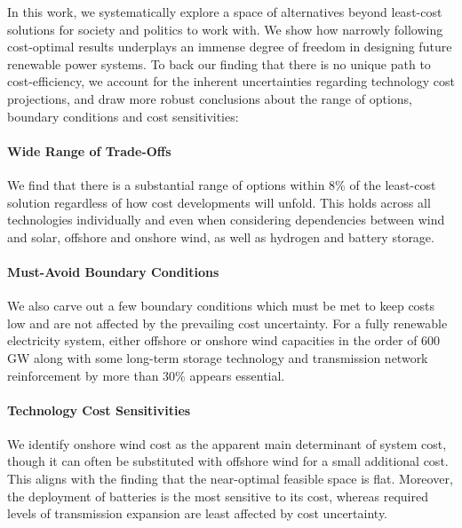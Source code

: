 In this work, we systematically explore a space of alternatives beyond
least-cost solutions for society and politics to work with. We show how narrowly
following cost-optimal results underplays an immense degree of freedom in
designing future renewable power systems. To back our finding that there is no
unique path to cost-efficiency, we account for the inherent uncertainties
regarding technology cost projections, and draw more robust conclusions about
the range of options, boundary conditions and cost sensitivities:

\paragraph{Wide Range of Trade-Offs}
We find that there is a substantial range of options
within 8\% of the least-cost solution
regardless of how cost developments will unfold.
This holds across all technologies individually
and even when considering dependencies between
wind and solar, offshore and onshore wind, as well as hydrogen and battery storage.

\paragraph{Must-Avoid Boundary Conditions}
We also carve out a few boundary conditions which
must be met to keep costs low and are not affected
by the prevailing cost uncertainty.
For a fully renewable electricity system,
either offshore or onshore wind capacities
in the order of 600 GW
along with some long-term storage technology and
transmission network reinforcement by more than 30\% appears essential.


\paragraph{Technology Cost Sensitivities}
We identify onshore wind cost as the apparent main determinant of system cost,
though it can often be substituted with offshore wind for a small additional cost.
This aligns with the finding that the near-optimal feasible space is flat.
Moreover, the deployment of batteries is the most sensitive to its cost,
whereas required levels of transmission expansion are least affected by cost uncertainty. \\

